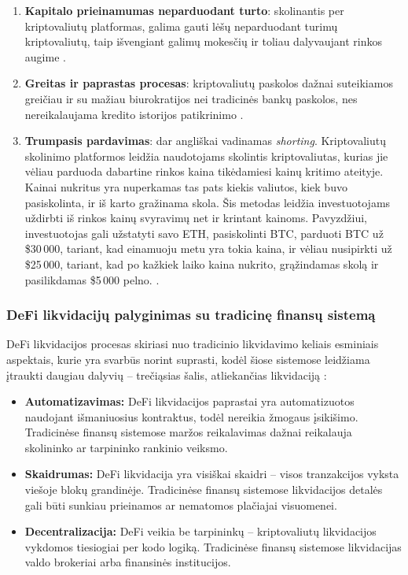 \documentclass[]{VUMIFTemplateClass}
\begin{document}
\begin{enumerate}
    \item \textbf{Kapitalo prieinamumas neparduodant turto}: skolinantis per kriptovaliutų platformas, galima gauti lėšų neparduodant turimų kriptovaliutų, taip išvengiant galimų mokesčių ir toliau dalyvaujant rinkos augime \cite{kriptovaliutosio}.
    \item \textbf{Greitas ir paprastas procesas}: kriptovaliutų paskolos dažnai suteikiamos greičiau ir su mažiau biurokratijos nei tradicinės bankų paskolos, nes nereikalaujama kredito istorijos patikrinimo \cite{targettrend}.
    \item \textbf{Trumpasis pardavimas}: dar angliškai vadinamas \textit{shorting}. Kriptovaliutų skolinimo platformos leidžia naudotojams skolintis kriptovaliutas, kurias jie vėliau parduoda dabartine rinkos kaina tikėdamiesi kainų kritimo ateityje. Kainai nukritus yra nuperkamas tas pats kiekis valiutos, kiek buvo pasiskolinta, ir iš karto gražinama skola. Šis metodas leidžia investuotojams uždirbti iš rinkos kainų svyravimų net ir krintant kainoms. Pavyzdžiui, investuotojas gali užstatyti savo ETH, pasiskolinti BTC, parduoti BTC už \$30\,000, tariant, kad einamuoju metu yra tokia kaina, ir vėliau nusipirkti už \$25\,000, tariant, kad po kažkiek laiko kaina nukrito, grąžindamas skolą ir pasilikdamas \$5\,000 pelno.
    \cite{shortinimas}.
\end{enumerate}

\subsubsection{DeFi likvidacijų palyginimas su tradicinę finansų sistemą}
DeFi likvidacijos procesas skiriasi nuo tradicinio likvidavimo keliais esminiais aspektais, kurie yra svarbūs norint suprasti, kodėl šiose sistemose leidžiama įtraukti daugiau dalyvių – trečiąsias šalis, atliekančias likvidaciją \cite{whatisdefiliquidation}:

\begin{itemize}
    \item \textbf{Automatizavimas:} DeFi likvidacijos paprastai yra automatizuotos naudojant išmaniuosius kontraktus, todėl nereikia žmogaus įsikišimo. Tradicinėse finansų sistemose maržos reikalavimas dažnai reikalauja skolininko ar tarpininko rankinio veiksmo.
    
    \item \textbf{Skaidrumas:} DeFi likvidacija yra visiškai skaidri – visos tranzakcijos vyksta viešoje blokų grandinėje. Tradicinėse finansų sistemose likvidacijos detalės gali būti sunkiau prieinamos ar nematomos plačiajai visuomenei.
    
    \item \textbf{Decentralizacija:} DeFi veikia be tarpininkų – kriptovaliutų likvidacijos vykdomos tiesiogiai per kodo logiką. Tradicinėse finansų sistemose likvidacijas valdo brokeriai arba finansinės institucijos.
\end{itemize}
\end{document}
